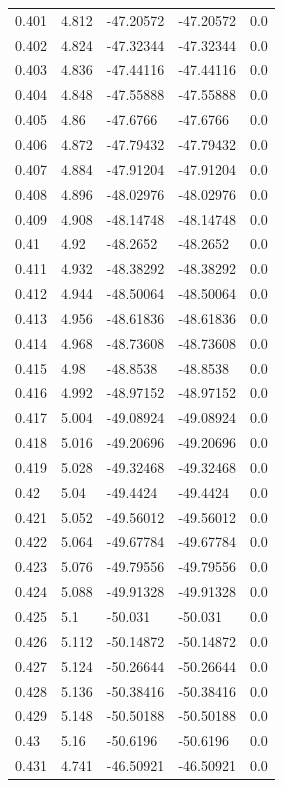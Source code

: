 \begin{tabular}{lllll}
0.401 & 4.812 & -47.20572 & -47.20572 & 0.0 \\
0.402 & 4.824 & -47.32344 & -47.32344 & 0.0 \\
0.403 & 4.836 & -47.44116 & -47.44116 & 0.0 \\
0.404 & 4.848 & -47.55888 & -47.55888 & 0.0 \\
0.405 & 4.86 & -47.6766 & -47.6766 & 0.0 \\
0.406 & 4.872 & -47.79432 & -47.79432 & 0.0 \\
0.407 & 4.884 & -47.91204 & -47.91204 & 0.0 \\
0.408 & 4.896 & -48.02976 & -48.02976 & 0.0 \\
0.409 & 4.908 & -48.14748 & -48.14748 & 0.0 \\
0.41 & 4.92 & -48.2652 & -48.2652 & 0.0 \\
0.411 & 4.932 & -48.38292 & -48.38292 & 0.0 \\
0.412 & 4.944 & -48.50064 & -48.50064 & 0.0 \\
0.413 & 4.956 & -48.61836 & -48.61836 & 0.0 \\
0.414 & 4.968 & -48.73608 & -48.73608 & 0.0 \\
0.415 & 4.98 & -48.8538 & -48.8538 & 0.0 \\
0.416 & 4.992 & -48.97152 & -48.97152 & 0.0 \\
0.417 & 5.004 & -49.08924 & -49.08924 & 0.0 \\
0.418 & 5.016 & -49.20696 & -49.20696 & 0.0 \\
0.419 & 5.028 & -49.32468 & -49.32468 & 0.0 \\
0.42 & 5.04 & -49.4424 & -49.4424 & 0.0 \\
0.421 & 5.052 & -49.56012 & -49.56012 & 0.0 \\
0.422 & 5.064 & -49.67784 & -49.67784 & 0.0 \\
0.423 & 5.076 & -49.79556 & -49.79556 & 0.0 \\
0.424 & 5.088 & -49.91328 & -49.91328 & 0.0 \\
0.425 & 5.1 & -50.031 & -50.031 & 0.0 \\
0.426 & 5.112 & -50.14872 & -50.14872 & 0.0 \\
0.427 & 5.124 & -50.26644 & -50.26644 & 0.0 \\
0.428 & 5.136 & -50.38416 & -50.38416 & 0.0 \\
0.429 & 5.148 & -50.50188 & -50.50188 & 0.0 \\
0.43 & 5.16 & -50.6196 & -50.6196 & 0.0 \\
0.431 & 4.741 & -46.50921 & -46.50921 & 0.0 \\

\end{tabular}
